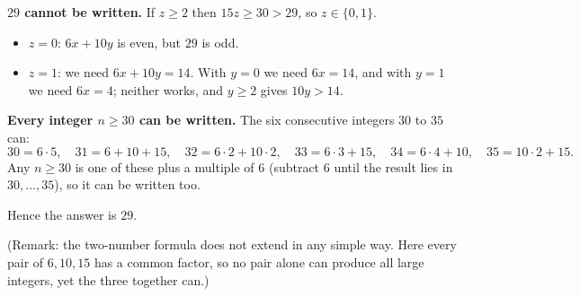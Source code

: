\textbf{$29$ cannot be written.} If $z\ge2$ then $15z\ge30>29$, so $z\in\{0,1\}$.
\begin{itemize}
\item $z=0$: $6x+10y$ is even, but $29$ is odd.
\item $z=1$: we need $6x+10y=14$. With $y=0$ we need $6x=14$, and with $y=1$ we need $6x=4$; neither works, and $y\ge2$ gives $10y>14$.
\end{itemize}

\textbf{Every integer $n\ge30$ can be written.} The six consecutive integers $30$ to $35$ can:
\[30=6\cdot5,\quad31=6+10+15,\quad32=6\cdot2+10\cdot2,\quad33=6\cdot3+15,\quad34=6\cdot4+10,\quad35=10\cdot2+15.\]
Any $n\ge30$ is one of these plus a multiple of $6$ (subtract $6$ until the result lies in $30,\dots,35$), so it can be written too.

Hence the answer is $\boxed{29}$.

(Remark: the two-number formula does not extend in any simple way. Here every pair of $6,10,15$ has a common factor, so no pair alone can produce all large integers, yet the three together can.)
